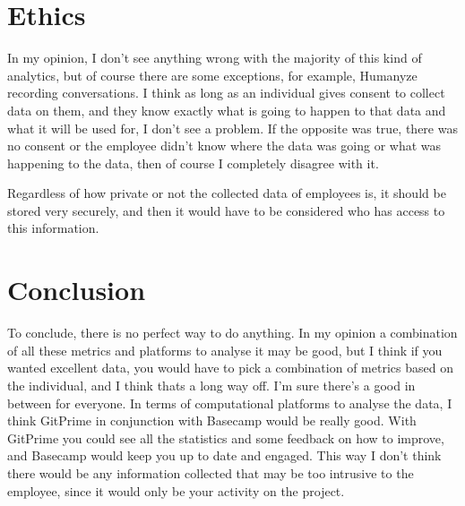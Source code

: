 \documentclass[12pt]{report}
\begin{document}
\section{Ethics}
In my opinion, I don't see anything wrong with the majority of this kind of analytics, but of course there are some exceptions, for example, Humanyze recording conversations. I think as long as an individual gives consent to collect data on them, and they know exactly what is going to happen to that data and what it will be used for, I don't see a problem. If the opposite was true, there was no consent or the employee didn't know where the data was going or what was happening to the data, then of course I completely disagree with it. \par
Regardless of how private or not the collected data of employees is, it should be stored very securely, and then it would have to be considered who has access to this information.

\section{Conclusion}
To conclude, there is no perfect way to do anything. In my opinion a combination of all these metrics and platforms to analyse it may be good, but I think if you wanted excellent data, you would have to pick a combination of metrics based on the individual, and I think thats a long way off. I'm sure there's a good in between for everyone. In terms of computational platforms to analyse the data, I think GitPrime in conjunction with Basecamp would be really good. With GitPrime you could see all the statistics and some feedback on how to improve, and Basecamp would keep you up to date and engaged. This way I don't think there would be any information collected that may be too intrusive to the employee, since it would only be your activity on the project. 
\end{document}
